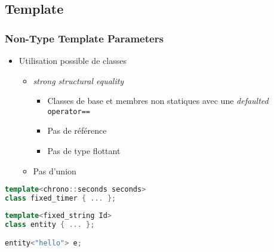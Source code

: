 \documentclass[C++.tex]{subfiles}
\begin{document}
\subsection*{Template}
\begin{frame}[fragile]
	\frametitle{Non-Type Template Parameters}
	\begin{itemize}
		\item Utilisation possible de classes
		\begin{itemize}
			\item \textit{strong structural equality}
			\begin{itemize}
				\item Classes de base et membres non statiques avec une \textit{defaulted} \lstinline|operator==|
				\item Pas de référence
				\item Pas de type flottant
			\end{itemize}
			\item Pas d'union
		\end{itemize}
	\end{itemize}

	\begin{lstlisting}[language=C++]
template<chrono::seconds seconds>
class fixed_timer { ... };\end{lstlisting}


	\begin{lstlisting}[language=C++]
template<fixed_string Id>
class entity { ... };

entity<"hello"> e;\end{lstlisting}

\end{frame}
\end{document}
